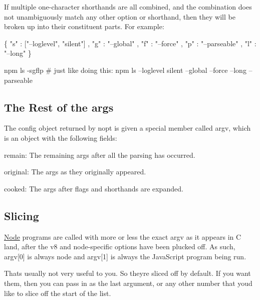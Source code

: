 If multiple one-\/character shorthands are all combined, and the combination does not unambiguously match any other option or shorthand, then they will be broken up into their constituent parts. For example\+:


\begin{DoxyCode}
\{ "s" : ["--loglevel", "silent"]
, "g" : "--global"
, "f" : "--force"
, "p" : "--parseable"
, "l" : "--long"
\}
\end{DoxyCode}



\begin{DoxyCode}
npm ls -sgflp
# just like doing this:
npm ls --loglevel silent --global --force --long --parseable
\end{DoxyCode}


\subsection*{The Rest of the args}

The config object returned by nopt is given a special member called {\ttfamily argv}, which is an object with the following fields\+:


\begin{DoxyItemize}
\item {\ttfamily remain}\+: The remaining args after all the parsing has occurred.
\item {\ttfamily original}\+: The args as they originally appeared.
\item {\ttfamily cooked}\+: The args after flags and shorthands are expanded.
\end{DoxyItemize}

\subsection*{Slicing}

\mbox{\hyperlink{classNode}{Node}} programs are called with more or less the exact argv as it appears in C land, after the v8 and node-\/specific options have been plucked off. As such, {\ttfamily argv\mbox{[}0\mbox{]}} is always {\ttfamily node} and {\ttfamily argv\mbox{[}1\mbox{]}} is always the Java\+Script program being run.

That\textquotesingle{}s usually not very useful to you. So they\textquotesingle{}re sliced off by default. If you want them, then you can pass in {} as the last argument, or any other number that you\textquotesingle{}d like to slice off the start of the list. 